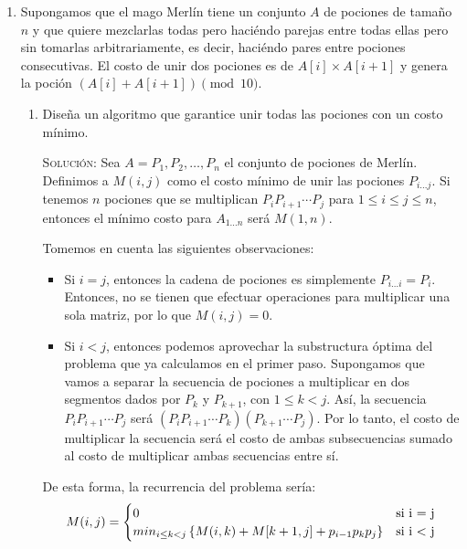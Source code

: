 \documentclass[letterpaper,11pt]{article}
\begin{document}
\begin{enumerate}
    \item Supongamos que el mago Merlín tiene un conjunto $A$ de pociones de 
    tamaño $n$ y que quiere mezclarlas todas pero haciéndo parejas entre 
    todas ellas pero sin tomarlas arbitrariamente, es decir, haciéndo pares 
    entre pociones consecutivas. El costo de unir dos pociones es de 
    $A[i] \times A[i+1]$ y genera la poción $(A[i] + A[i+1]) \pmod{10}$. 
    \begin{enumerate}
        \item Diseña un algoritmo que garantice unir todas las pociones con 
        un costo mínimo.

        \textsc{Solución:} Sea $A = P_1, P_2, \ldots, P_n$ el conjunto de 
        pociones de Merlín. Definimos a $M(i,j)$ como el costo mínimo de 
        unir las pociones $P_{i \ldots j}$. Si tenemos $n$ pociones que 
        se multiplican $P_i P_{i+1} \cdots P_j$ para $1 \leq i \leq j \leq n$,
        entonces el mínimo costo para $A_{1 \ldots n}$ será $M(1, n)$. 
        
        Tomemos en cuenta las siguientes observaciones:
        \begin{itemize}
            \item Si $i = j$, entonces la cadena de pociones es simplemente 
            $P_{i \ldots i} = P_i$. Entonces, no se tienen que efectuar 
            operaciones para multiplicar una sola matriz, por lo que 
            $M(i,j) = 0$.

            \item Si $i < j$, entonces podemos aprovechar la substructura 
            óptima del problema que ya calculamos en el primer paso.
            Supongamos que vamos a separar la secuencia de pociones a 
            multiplicar en dos segmentos dados por $P_k$ y $P_{k+1}$, con 
            $1 \leq k < j$. Así, la secuencia $P_i P_{i+1} \cdots P_j$
            será $(P_i P_{i+1} \cdots P_k)(P_{k+1} \cdots P_j)$. Por lo 
            tanto, el costo de multiplicar la secuencia será el costo de 
            ambas subsecuencias sumado al costo de multiplicar ambas secuencias 
            entre sí. 
        \end{itemize}

        De esta forma, la recurrencia del problema sería:
        \begin{equation*}
            M(i,j) = 
            \begin{cases}
                0 & \text{si } $i = j$ \\
                min_{i \leq k < j} \left\{M(i,k) + M[k+1, j] + 
                p_{i-1} p_k p_j\right\} & \text{si } $i < j$
            \end{cases}
        \end{equation*}


\end{enumerate}
\end{enumerate}
\end{document}
